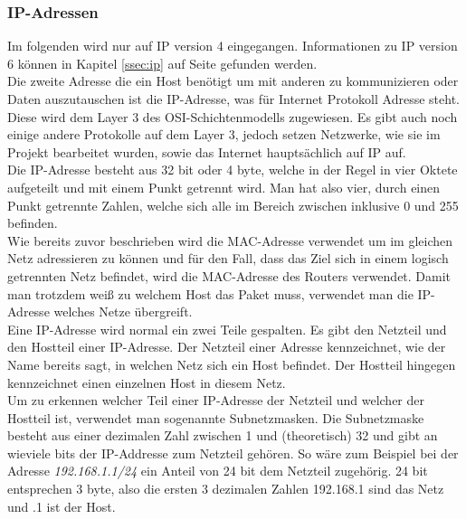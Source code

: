 \documentclass[12pt,a4paper]{report}
\begin{document}
\subsubsection{IP-Adressen}
Im folgenden wird nur auf IP version 4 eingegangen. Informationen zu IP version 6 können in Kapitel \ref{ssec:ip} auf Seite \pageref{ssec:ip} gefunden werden.\\
Die zweite Adresse die ein Host benötigt um mit anderen zu kommunizieren oder Daten auszutauschen ist die IP-Adresse, was für Internet Protokoll Adresse steht. Diese wird dem Layer 3 des OSI-Schichtenmodells zugewiesen. Es gibt auch noch einige andere Protokolle auf dem Layer 3, jedoch setzen Netzwerke, wie sie im Projekt bearbeitet wurden, sowie das Internet hauptsächlich auf IP auf.\\
Die IP-Adresse besteht aus 32 bit oder 4 byte, welche in der Regel in vier Oktete aufgeteilt und mit einem Punkt getrennt wird. Man hat also vier, durch einen Punkt getrennte Zahlen, welche sich alle im Bereich zwischen inklusive 0 und 255 befinden.\\
Wie bereits zuvor beschrieben wird die MAC-Adresse verwendet um im gleichen Netz adressieren zu können und für den Fall, dass das Ziel sich in einem logisch getrennten Netz befindet, wird die MAC-Adresse des Routers verwendet. Damit man trotzdem weiß zu welchem Host das Paket muss, verwendet man die IP-Adresse welches Netze übergreift.\\
Eine IP-Adresse wird normal ein zwei Teile gespalten. Es gibt den Netzteil und den Hostteil einer IP-Adresse. Der Netzteil einer Adresse kennzeichnet, wie der Name bereits sagt, in welchen Netz sich ein Host befindet. Der Hostteil hingegen kennzeichnet einen einzelnen Host in diesem Netz.\\
Um zu erkennen welcher Teil einer IP-Adresse der Netzteil und welcher der Hostteil ist, verwendet man sogenannte Subnetzmasken. Die Subnetzmaske besteht aus einer dezimalen Zahl zwischen 1 und (theoretisch) 32 und gibt an wieviele bits der IP-Addresse zum Netzteil gehören. So wäre zum Beispiel bei der Adresse \textit{192.168.1.1/24} ein Anteil von 24 bit dem Netzteil zugehörig. 24 bit entsprechen 3 byte, also die ersten 3 dezimalen Zahlen 192.168.1 sind das Netz und .1 ist der Host.
\end{document}
